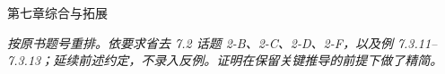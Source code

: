 \documentclass[11pt,a4paper]{ctexart}
\begin{document}
\begin{center}{\LARGE 第七章\quad 综合与拓展}\end{center}
\noindent\textit{按原书题号重排。依要求省去 7.2 话题 2-B、2-C、2-D、2-F，以及例 7.3.11--7.3.13；延续前述约定，不录入反例。证明在保留关键推导的前提下做了精简。}



\end{document}
